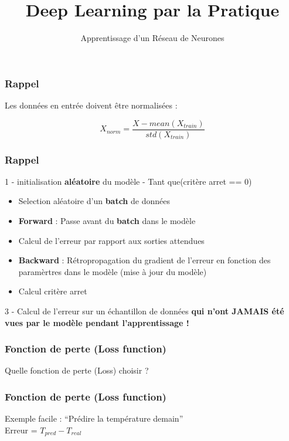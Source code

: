\documentclass{formation}
\title{Deep Learning par la Pratique}
\subtitle{Apprentissage d'un Réseau de Neurones}
\begin{document}
\maketitle

\begin{frame}
  \frametitle{Rappel}
  Les données en entrée doivent être normalisées :
  \huge
  \begin{center}
    \[
    X_{norm} = \frac{X - mean(X_{train})}{std(X_{train})}
    \]
  \end{center}
\end{frame}

\begin{frame}
  \frametitle{Rappel}
  1 - initialisation \textbf{aléatoire} du modèle
   - Tant que(critère arret == 0)
  \begin{itemize}
  \item Selection aléatoire d'un \textbf{batch} de données
  \item \textbf{Forward} : Passe avant du \textbf{batch} dans le modèle
  \item Calcul de l'erreur par rapport aux sorties attendues
  \item \textbf{Backward} : Rétropropagation du gradient de l'erreur en fonction des paramèrtres dans le modèle (mise à jour du modèle)
  \item Calcul critère arret
  \end{itemize}
  3 - Calcul de l'erreur sur un échantillon de données  \textbf{qui n'ont JAMAIS été vues par le modèle pendant l'apprentissage !}
\end{frame}

\begin{frame}
  \frametitle{Fonction de perte (\textbf{Loss} function)}
  \begin{center}
    \huge{Quelle fonction de perte (Loss) choisir ?}
  \end{center}
\end{frame}

\begin{frame}
  \frametitle{Fonction de perte (\textbf{Loss} function)}
  Exemple facile : ``Prédire la température demain'' \\
  \newline
  \newline
  Erreur = $T_{pred} - T_{real}$
\end{frame}
\end{document}
